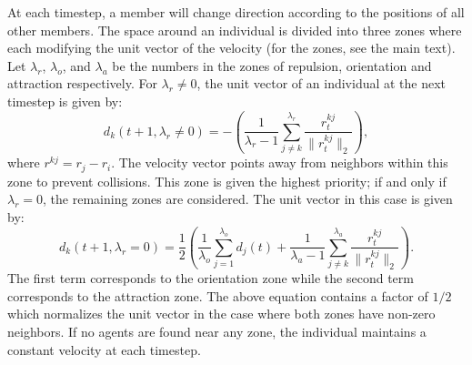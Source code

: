 \documentclass[journal]{IEEEtran}
\begin{document}
At each timestep, a member will change direction according to the positions of all other members. The space around an individual is divided into three zones where each modifying the unit vector of the velocity (for the zones, see the main text).
Let $\lambda_r$, $\lambda_o$, and $\lambda_a$ be the numbers in the zones of repulsion, orientation and attraction respectively. For $\lambda_r \neq 0$, the unit vector of an individual at the next timestep is given by:
\begin{equation} 
\label{eq:boid1}
d_k(t+1 , \lambda_r \neq 0 )=-\left(\frac{1}{\lambda_r-1}\sum_{j\neq k}^{\lambda_r}\frac{r^{kj}_t}{\|r^{kj}_t\|_2}\right),
\end{equation} 
where $r^{kj}={r}_j-{r}_i$.
The velocity vector points away from neighbors within this zone to prevent collisions. This zone is given the highest priority; if and only if $\lambda_r = 0$, the remaining zones are considered. 
The unit vector in this case is given by:
\begin{equation} 
\label{eq:boid2}
d_k(t+1 , {\lambda}_r=0)=\frac{1}{2}\left(\frac{1}{\lambda_o}\sum_{j=1}^{\lambda_o} d_j(t)+\frac{1}{\lambda_a-1}\sum_{j\neq k}^{{\lambda}_a}\frac{r^{kj}_t}{\|r^{kj}_t\|_2}\right).
\end{equation} 
The first term corresponds to the orientation zone while the second term corresponds to the attraction zone. The above equation contains a factor of $1/2$ which normalizes the unit vector in the case where both zones have non-zero neighbors. If no agents are found near any zone, the individual maintains a constant velocity at each timestep.
\end{document}
